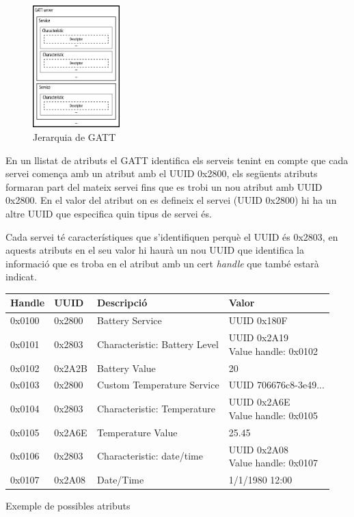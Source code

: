 \begin{figure}[h!]
	\begin{center}
		\includegraphics[width=0.3\textwidth]{./images/GATT_Hierarchy.png}
		\caption{Jerarquia de GATT \cite{GATT_Hierarchy}}
	\end{center}
\end{figure}

En un llistat de atributs el GATT identifica els serveis tenint en compte que cada servei comença amb un atribut amb el UUID 0x2800, els següents atributs formaran part del mateix servei fins que es trobi un nou atribut amb UUID 0x2800. En el valor del atribut on es defineix el servei (UUID 0x2800) hi ha un altre UUID que especifica quin tipus de servei és.

Cada servei té característiques \cite{characteristics} que s'identifiquen perquè el UUID és 0x2803, en aquests atributs en el seu valor hi haurà un nou UUID que identifica la informació que es troba en el atribut amb un cert \textit{handle} que també estarà indicat.

\begin{center}
	\begin{tabular}{|l|l|l|l|}
		\hline
		Handle	&	UUID	&	Descripció						&	Valor		\\ 	\hline
		0x0100	&	0x2800	&	Battery Service					&	UUID 0x180F	\\		\hline
		0x0101	&	0x2803	&	Characteristic: Battery Level	&	\parbox[t]{4cm}{UUID 0x2A19	\\ Value handle: 0x0102}	\\	\hline
		0x0102	&	0x2A2B	&	Battery Value					&	20	\\	\hline
		0x0103	&	0x2800	&	Custom Temperature Service		&	UUID 	706676c8-3e49...	\\	\hline
		0x0104	&	0x2803	&	Characteristic: Temperature		&	\parbox[t]{4cm}{UUID 0x2A6E	\\ Value handle: 0x0105}	\\		\hline
		0x0105	&	0x2A6E	&	Temperature Value				&	25.45	\\	\hline
		0x0106	&	0x2803	&	Characteristic: date/time		&	\parbox[t]{4cm}{UUID 0x2A08	\\ Value handle: 0x0107}	\\		\hline
		0x0107	&	0x2A08	&	Date/Time						&	1/1/1980 12:00	\\
		\hline
	\end{tabular}

Exemple de possibles atributs
\end{center}

